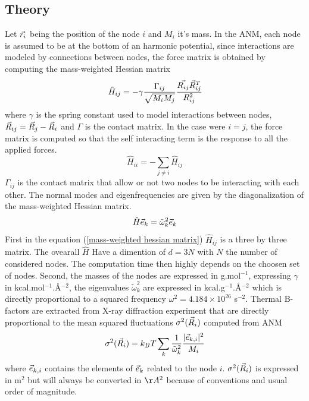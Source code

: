 \subsection{Theory}
\noindent Let $\vec{r_i}$ being the position of the node $i$ and $M_i$ it's mass. In the ANM, each node is assumed to be at the bottom of an harmonic potential, since interactions are modeled by connections between nodes, the force matrix is obtained by computing the mass-weighted Hessian matrix
\begin{equation}
	\label{mass-weighted hessian matrix}
	\hat{H}_{ij} = -\gamma\frac{\Gamma_{ij}}{\sqrt{M_iM_j}}\cfrac{\vec{R_{ij}}\vec{R}^T_ {ij}}{R^2_ {ij}}
\end{equation}
where $\gamma$ is the spring constant used to model interactions between nodes, $\vec{R}_{ij} = \vec{R}_j - \vec{R}_i$ and $\Gamma$ is the contact matrix. In the case were $i = j$, the force matrix is computed so that the self interacting term is the response to all the applied forces.
\begin{equation}
	\label{self interacting terms}
	\hat{H}_{ii} = -\sum_{j \ne i}\hat{H}_{ij}
\end{equation}
$\Gamma_{ij}$ is the contact matrix that allow or not two nodes to be interacting with each other. The normal modes and eigenfrequencies are given by the diagonalization of the mass-weighted Hessian matrix.
\begin{equation}
	\label{eigen equation}
	\hat{H}\vec{e}_k = \tilde{\omega}_k^2\vec{e}_k
\end{equation}
First in the equation (\ref{mass-weighted hessian matrix}) $\hat{H}_{ij}$ is a three by three matrix. The ovearall $\hat{H}$ Have a dimention of $d = 3N$ with $N$ the number of considered nodes. The computation time then highly depends on the choosen set of nodes. Second, the masses of the nodes are expressed in g.mol$^{-1}$, expressing $\gamma$ in kcal.mol$^{-1}$.\AA$^{-2}$, the eigenvalues $\tilde{\omega}_k^2$ are expressed in kcal.g$^{-1}$.\AA$^{-2}$ which is directly proportional to a squared frequency $\omega^2 = 4.184 \times 10^{26}$ s$^{-2}$. Thermal B-factors are extracted from X-ray diffraction experiment that are directly proportional to the mean squared fluctuations $\sigma^2(\vec{R}_i)$ computed from ANM
\begin{equation}
	\label{thermal B-factors}
	\sigma^2(\vec{R}_i) = k_BT\sum_k\frac{1}{\tilde{\omega}_k^2} \cfrac{\vert\vec{e}_{k, i}\vert^2}{M_i}
\end{equation}
where $\vec{e}_{k, i}$ contains the elements of $\vec{e}_k$ related to the node $i$. $\sigma^2(\vec{R}_i)$ is expressed in m$^2$ but will always be converted in $\AA^2$ because of conventions and usual order of magnitude.\\
